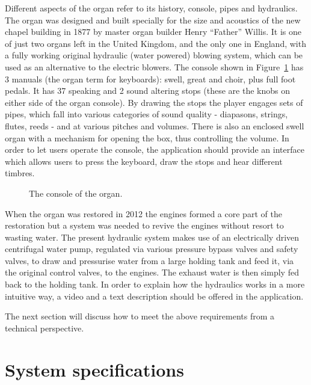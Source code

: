 Different aspects of the organ refer to its history, console, pipes and hydraulics. The organ was designed and built specially for the size and acoustics of the new chapel building in 1877 by master organ builder Henry \enquote{Father} Willis. It is one of just two organs left in the United Kingdom, and the only one in England, with a fully working original hydraulic (water powered) blowing system, which can be used as an alternative to the electric blowers. The console shown in Figure~\ref{fig:console} has 3 manuals (the organ term for keyboards): swell, great and choir, plus full foot pedals. It has 37 speaking and 2 sound altering stops (these are the knobs on either side of the organ console). By drawing the stops the player engages sets of pipes, which fall into various categories of sound quality - diapasons, strings, flutes, reeds - and at various pitches and volumes. There is also an enclosed swell organ with a mechanism for opening the box, thus controlling the volume. In order to let users operate the console, the application should provide an interface which allows users to press the keyboard, draw the stops and hear different timbres.
\begin{figure}
\centerline{}
\caption{The console of the organ.} 
\label{fig:console}
\end{figure}

When the organ was restored in 2012 the engines formed a core part of the restoration but a system was needed to revive the engines without resort to wasting water. The present hydraulic system makes use of an electrically driven centrifugal water pump, regulated via various pressure bypass valves and safety valves, to draw and pressurise water from a large holding tank and feed it, via the original control valves, to the engines. The exhaust water is then simply fed back to the holding tank. In order to explain how the hydraulics works in a more intuitive way, a video and a text description should be offered in the application.

The next section will discuss how to meet the above requirements from a technical perspective.

\section{System specifications}
